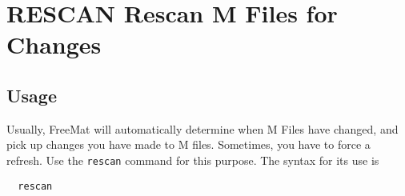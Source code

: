 \section{RESCAN Rescan M Files for Changes}

\subsection{Usage}

Usually, FreeMat will automatically determine when M Files have
changed, and pick up changes you have made to M files.  Sometimes,
you have to force a refresh.  Use the \verb|rescan| command for this
purpose.  The syntax for its use is 
\begin{verbatim}
  rescan
\end{verbatim}
